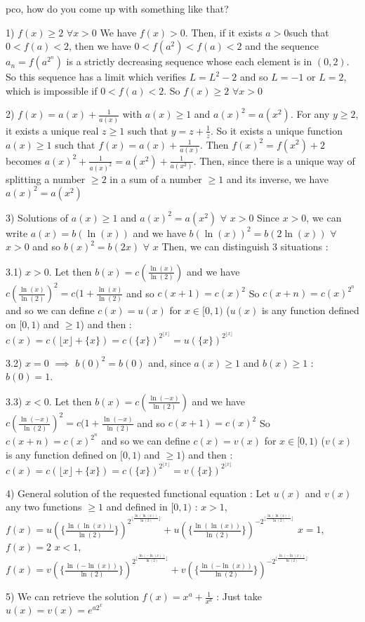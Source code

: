 \begin{mysolution}
	\begin{tcolorbox}pco, how do you come up with something like that?\end{tcolorbox}

1) $f(x)\geq 2$ $\forall x>0$
We have $f(x)>0$. Then, if it exists $a>0$such that $0<f(a)<2$, then we have $0<f(a^{2})<f(a)<2$ and the sequence $a_{n}=f(a^{2^{n}})$ is a strictly decreasing sequence whose each element is in $(0,2)$. So this sequence has a limit which verifies $L=L^{2}-2$ and so $L=-1$ or $L=2$, which is impossible if $0<f(a)<2$.
So $f(x)\geq 2$ $\forall x>0$

2) $f(x)=a(x)+\frac{1}{a(x)}$ with $a(x)\geq 1$ and $a(x)^{2}=a(x^{2})$.
For any $y\geq 2$, it exists a unique real $z\geq 1$ such that $y=z+\frac{1}{z}$. So it exists a unique function $a(x)\geq 1$ such that $f(x)=a(x)+\frac{1}{a(x)}$.
Then $f(x)^{2}=f(x^{2})+2$ becomes $a(x)^{2}+\frac{1}{a(x)^{2}}=a(x^{2})+\frac{1}{a(x^{2})}$.
Then, since there is a unique way of splitting a number $\geq 2$ in a sum of a number $\geq 1$ and its inverse, we have $a(x)^{2}=a(x^{2})$

3) Solutions of $a(x)\geq 1$ and $a(x)^{2}=a(x^{2})$ $\forall$ $x>0$
Since $x>0$, we can write $a(x)=b(\ln(x))$ and we have $b(\ln(x))^{2}=b(2\ln(x))$ $\forall$ $x>0$ and so $b(x)^{2}=b(2x)$ $\forall$ $x$
Then, we can distinguish 3 situations :

3.1) $x>0$. Let then $b(x)=c(\frac{\ln(x)}{\ln(2)})$ and we have $c(\frac{\ln(x)}{\ln(2)})^{2}=c(1+\frac{\ln(x)}{\ln(2)}$ and so $c(x+1)=c(x)^{2}$
So $c(x+n)=c(x)^{2^{n}}$ and so we can define $c(x)=u(x)$ for $x\in[0,1)$ ($u(x)$ is any function defined on $[0,1)$ and $\geq 1$) and then :
$c(x)=c(\lfloor x\rfloor+\{x\})=c(\{x\})^{2^{\lfloor x \rfloor }}=u(\{x\})^{2^{\lfloor x \rfloor }}$

3.2) $x=0$ $\implies$ $b(0)^{2}=b(0)$ and, since $a(x)\geq 1$ and $b(x)\geq 1$ : $b(0)=1$.

3.3) $x<0$. Let then $b(x)=c(\frac{\ln(-x)}{\ln(2)})$ and we have $c(\frac{\ln(-x)}{\ln(2)})^{2}=c(1+\frac{\ln(-x)}{\ln(2)}$ and so $c(x+1)=c(x)^{2}$
So $c(x+n)=c(x)^{2^{n}}$ and so we can define $c(x)=v(x)$ for $x\in[0,1)$ ($v(x)$ is any function defined on $[0,1)$ and $\geq 1$) and then :
$c(x)=c(\lfloor x\rfloor+\{x\})=c(\{x\})^{2^{\lfloor x \rfloor }}=v(\{x\})^{2^{\lfloor x \rfloor }}$

4) General solution of the requested functional equation :
Let $u(x)$ and $v(x)$ any two functions $\geq 1$ and defined in $[0,1)$ :
$x>1$, $f(x)=u(\{\frac{\ln(\ln(x))}{\ln(2)}\})^{2^{\lfloor \frac{\ln(\ln(x))}{\ln(2)}\rfloor }}+u(\{\frac{\ln(\ln(x))}{\ln(2)}\})^{-2^{\lfloor \frac{\ln(\ln(x))}{\ln(2)}\rfloor }}$
$x=1$, $f(x)=2$
$x<1$, $f(x)=v(\{\frac{\ln(-\ln(x))}{\ln(2)}\})^{2^{\lfloor \frac{\ln(-\ln(x))}{\ln(2)}\rfloor }}+v(\{\frac{\ln(-\ln(x))}{\ln(2)}\})^{-2^{\lfloor \frac{\ln(-\ln(x))}{\ln(2)}\rfloor }}$

5) We can retrieve the solution $f(x)=x^{a}+\frac{1}{x^{a}}$ : Just take $u(x)=v(x)=e^{a2^{x}}$
\end{mysolution}



